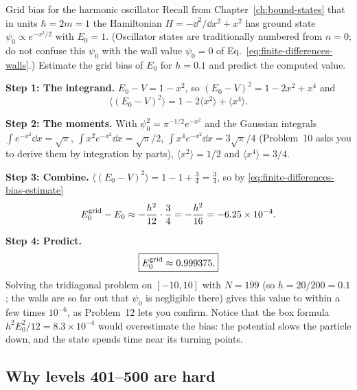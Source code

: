 \begin{sample}{Grid bias for the harmonic oscillator}
Recall from Chapter~\ref{ch:bound-states} that in units $\hbar=2m=1$ the Hamiltonian $H=-\dd^2/\dd x^2+x^2$ has ground state $\psi_0\propto e^{-x^2/2}$ with $E_0=1$. (Oscillator states are traditionally numbered from $n=0$; do not confuse this $\psi_0$ with the wall value $\psi_0=0$ of Eq.~\eqref{eq:finite-differences-walls}.) Estimate the grid bias of $E_0$ for $h=0.1$ and predict the computed value.

\textbf{Step 1: The integrand.} $E_0-V=1-x^2$, so $(E_0-V)^2=1-2x^2+x^4$ and
\begin{equation*}
\langle(E_0-V)^2\rangle=1-2\langle x^2\rangle+\langle x^4\rangle.
\end{equation*}

\textbf{Step 2: The moments.} With $\psi_0^2=\pi^{-1/2}e^{-x^2}$ and the Gaussian integrals $\int e^{-x^2}\dd x=\sqrt\pi$, $\int x^2e^{-x^2}\dd x=\sqrt\pi/2$, $\int x^4e^{-x^2}\dd x=3\sqrt\pi/4$ (Problem~10 asks you to derive them by integration by parts), $\langle x^2\rangle=1/2$ and $\langle x^4\rangle=3/4$.

\textbf{Step 3: Combine.} $\langle(E_0-V)^2\rangle=1-1+\tfrac34=\tfrac34$, so by \eqref{eq:finite-differences-bias-estimate}
\begin{equation*}
E_0^{\rm grid}-E_0\approx-\frac{h^2}{12}\cdot\frac34=-\frac{h^2}{16}=-6.25\times10^{-4}.
\end{equation*}

\textbf{Step 4: Predict.} 
\begin{equation*}
\boxed{E_0^{\rm grid}\approx0.999375.}
\end{equation*}
Solving the tridiagonal problem on $[-10,10]$ with $N=199$ (so $h=20/200=0.1$; the walls are so far out that $\psi_0$ is negligible there) gives this value to within a few times $10^{-6}$, as Problem~12 lets you confirm. Notice that the box formula $h^2E_0^2/12=8.3\times10^{-4}$ would overestimate the bias: the potential slows the particle down, and the state spends time near its turning points.
\end{sample}

\subsection{Why levels 401--500 are hard}

